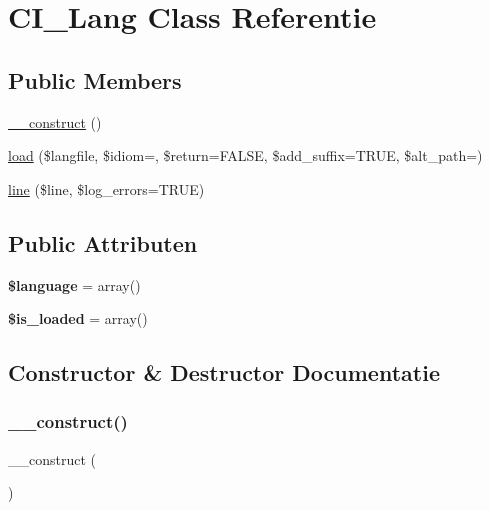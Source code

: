 \hypertarget{class_c_i___lang}{}\section{C\+I\+\_\+\+Lang Class Referentie}
\label{class_c_i___lang}
\subsection*{Public Members}
\begin{DoxyCompactItemize}
\item 
\mbox{\hyperlink{class_c_i___lang_a095c5d389db211932136b53f25f39685}{\+\_\+\+\_\+construct}} ()
\item 
\mbox{\hyperlink{class_c_i___lang_a38b49b0297816c583824cefbc30d0217}{load}} (\$langfile, \$idiom=\textquotesingle{}\textquotesingle{}, \$return=F\+A\+L\+SE, \$add\+\_\+suffix=T\+R\+UE, \$alt\+\_\+path=\textquotesingle{}\textquotesingle{})
\item 
\mbox{\hyperlink{class_c_i___lang_a60a06468111224f49dd5cd51e5dc1410}{line}} (\$line, \$log\+\_\+errors=T\+R\+UE)
\end{DoxyCompactItemize}
\subsection*{Public Attributen}
\begin{DoxyCompactItemize}
\item 
\mbox{\label{class_c_i___lang_a83170d318260a5a2e2a79dccdd371b10}} 
{\bfseries \$language} = array()
\item 
\mbox{\label{class_c_i___lang_a908e9ad52a5d1956d360689452f6bdbe}} 
{\bfseries \$is\+\_\+loaded} = array()
\end{DoxyCompactItemize}


\subsection{Constructor \& Destructor Documentatie}
\mbox{\label{class_c_i___lang_a095c5d389db211932136b53f25f39685}} 
\subsubsection{\texorpdfstring{\_\_construct()}{\_\_construct()}}
{\footnotesize\ttfamily \+\_\+\+\_\+construct (\begin{DoxyParamCaption}{ }\end{DoxyParamCaption})}

